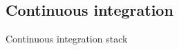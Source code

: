 \documentclass{beamer}
\begin{document}
\subsection{Continuous integration}
\begin{frame}{Continuous integration stack}
\begin{center}
\noindent{}
\end{center}
\end{frame}
\end{document}
